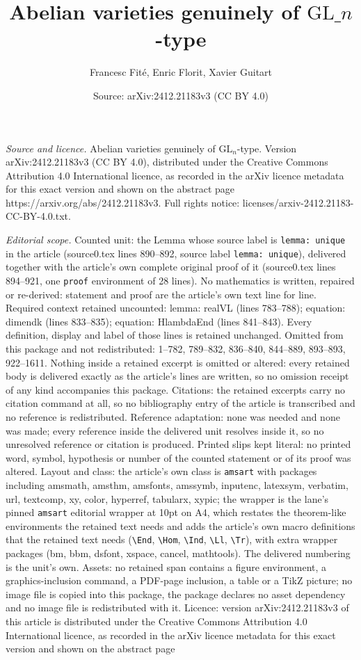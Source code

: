 \documentclass[10pt,a4paper]{amsart}
\title[Abelian varieties genuinely of $\mathrm{GL}\_n$-type]{Abelian varieties genuinely of $\mathrm{GL}\_n$-type}
\author{Francesc Fit\'e, Enric Florit, Xavier Guitart}
\date{Source: arXiv:2412.21183v3 (CC BY 4.0)}
\begin{document}
\maketitle

\noindent\emph{Source and licence.} Abelian varieties genuinely of $\mathrm{GL}_n$-type. Version arXiv:2412.21183v3 (CC BY 4.0), distributed under the Creative Commons Attribution 4.0 International licence, as recorded in the arXiv licence metadata for this exact version and shown on the abstract page https://arxiv.org/abs/2412.21183v3. Full rights notice: licenses/arxiv-2412.21183-CC-BY-4.0.txt.\par\smallskip

\noindent\textit{Editorial scope.} Counted unit: the Lemma whose source label is \texttt{lemma: unique} in the article (source0.tex lines 890--892, source label \texttt{lemma: unique}), delivered together with the article's own complete original proof of it (source0.tex lines 894--921, one \texttt{proof} environment of 28 lines). No mathematics is written, repaired or re-derived: statement and proof are the article's own text line for line. Required context retained uncounted: lemma: realVL (lines 783--788); equation: dimendk (lines 833--835); equation: HlambdaEnd (lines 841--843). Every definition, display and label of those lines is retained unchanged. Omitted from this package and not redistributed: 1--782, 789--832, 836--840, 844--889, 893--893, 922--1611. Nothing inside a retained excerpt is omitted or altered: every retained body is delivered exactly as the article's lines are written, so no omission receipt of any kind accompanies this package. Citations: the retained excerpts carry no citation command at all, so no bibliography entry of the article is transcribed and no reference is redistributed. Reference adaptation: none was needed and none was made; every reference inside the delivered unit resolves inside it, so no unresolved reference or citation is produced. Printed slips kept literal: no printed word, symbol, hypothesis or number of the counted statement or of its proof was altered. Layout and class: the article's own class is \texttt{amsart} with packages including amsmath, amsthm, amsfonts, amssymb, inputenc, latexsym, verbatim, url, textcomp, xy, color, hyperref, tabularx, xypic; the wrapper is the lane's pinned \texttt{amsart} editorial wrapper at 10pt on A4, which restates the theorem-like environments the retained text needs and adds the article's own macro definitions that the retained text needs (\texttt{\textbackslash End}, \texttt{\textbackslash Hom}, \texttt{\textbackslash Ind}, \texttt{\textbackslash Ll}, \texttt{\textbackslash Tr}), with extra wrapper packages (bm, bbm, dsfont, xspace, cancel, mathtools). The delivered numbering is the unit's own. Assets: no retained span contains a figure environment, a graphics-inclusion command, a PDF-page inclusion, a table or a TikZ picture; no image file is copied into this package, the package declares no asset dependency and no image file is redistributed with it. Licence: version arXiv:2412.21183v3 of this article is distributed under the Creative Commons Attribution 4.0 International licence, as recorded in the arXiv licence metadata for this exact version and shown on the abstract page 
\end{document}
